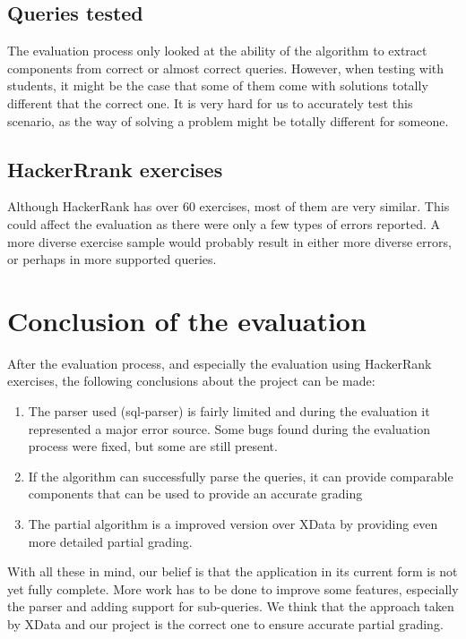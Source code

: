 \subsection{Queries tested}
The evaluation process only looked at the ability of the algorithm to extract components from correct or almost correct queries. However, when testing with students, it might be the case that some of them come with solutions totally different that the correct one. It is very hard for us to accurately test this scenario, as the way of solving a problem might be totally different for someone.

\subsection{HackerRrank exercises}
Although HackerRank has over 60 exercises, most of them are very similar. This could affect the evaluation as there were only a few types of errors reported. A more diverse exercise sample would probably result in either more diverse errors, or perhaps in more supported queries.

\section{Conclusion of the evaluation}
After the evaluation process, and especially the evaluation using HackerRank exercises, the following conclusions about the project can be made:
\begin{enumerate}
    \item The parser used (sql-parser) is fairly limited and during the evaluation it represented a major error source. Some bugs found during the evaluation process were fixed, but some are still present.
    \item If the algorithm can successfully parse the queries, it can provide comparable components that can be used to provide an accurate grading
    \item The partial algorithm is a improved version over XData by providing even more detailed partial grading.
\end{enumerate}

With all these in mind, our belief is that the application in its current form is not yet fully complete. More work has to be done to improve some features, especially the parser and adding support for sub-queries. We think that the approach taken by XData and our project is the correct one to ensure accurate partial grading.